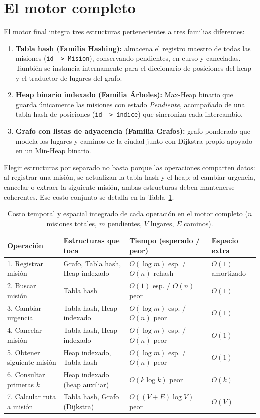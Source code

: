 \documentclass[11pt,a4paper]{article}
\begin{document}
\section{El motor completo}

El motor final integra tres estructuras pertenecientes a tres familias diferentes:
\begin{enumerate}
  \item \textbf{Tabla hash (Familia Hashing):} almacena el registro maestro de todas las misiones (\texttt{id -> Mision}), conservando pendientes, en curso y canceladas. También se instancia internamente para el diccionario de posiciones del heap y el traductor de lugares del grafo.
  \item \textbf{Heap binario indexado (Familia Árboles):} Max-Heap binario que guarda únicamente las misiones con estado \textit{Pendiente}, acompañado de una tabla hash de posiciones (\texttt{id -> índice}) que sincroniza cada intercambio.
  \item \textbf{Grafo con listas de adyacencia (Familia Grafos):} grafo ponderado que modela los lugares y caminos de la ciudad junto con Dijkstra propio apoyado en un Min-Heap binario.
\end{enumerate}

Elegir estructuras por separado no basta porque las operaciones comparten datos: al registrar una misión, se actualizan la tabla hash y el heap; al cambiar urgencia, cancelar o extraer la siguiente misión, ambas estructuras deben mantenerse coherentes. Ese costo conjunto se detalla en la Tabla~\ref{tab:resumen_motor}.

\begin{table}[htbp]
\centering
\caption{Costo temporal y espacial integrado de cada operación en el motor completo ($n$ misiones totales, $m$ pendientes, $V$ lugares, $E$ caminos).}
\label{tab:resumen_motor}
\small
\begin{tabular}{p{3.9cm} p{4.2cm} p{3.1cm} p{2.8cm}}
\toprule
\textbf{Operación} & \textbf{Estructuras que toca} & \textbf{Tiempo (esperado / peor)} & \textbf{Espacio extra} \\
\midrule
1. Registrar misión & Grafo, Tabla hash, Heap indexado & $O(\log m)$ esp. / $O(n)$ rehash & $O(1)$ amortizado \\
2. Buscar misión & Tabla hash & $O(1)$ esp. / $O(n)$ peor & $O(1)$ \\
3. Cambiar urgencia & Tabla hash, Heap indexado & $O(\log m)$ esp. / $O(n)$ peor & $O(1)$ \\
4. Cancelar misión & Tabla hash, Heap indexado & $O(\log m)$ esp. / $O(n)$ peor & $O(1)$ \\
5. Obtener siguiente misión & Heap indexado, Tabla hash & $O(\log m)$ esp. / $O(n)$ peor & $O(1)$ \\
6. Consultar primeras $k$ & Heap indexado (heap auxiliar) & $O(k \log k)$ peor & $O(k)$ \\
7. Calcular ruta a misión & Tabla hash, Grafo (Dijkstra) & $O((V+E)\log V)$ peor & $O(V)$ \\
\bottomrule
\end{tabular}
\end{table}
\end{document}
